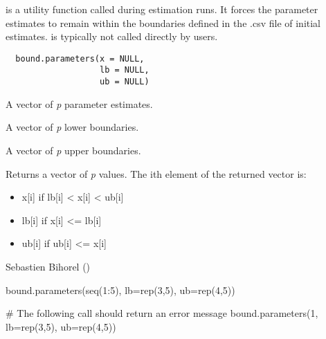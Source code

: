 %
\begin{Description}\relax
{} is a utility function called during estimation runs. 
It forces the parameter estimates to remain within the boundaries defined in 
the .csv file of initial estimates.  is typically not 
called directly by users.
\end{Description}
%
\begin{Usage}
\begin{verbatim}
  bound.parameters(x = NULL,
                   lb = NULL,
                   ub = NULL)
\end{verbatim}
\end{Usage}
%
\begin{Arguments}
\begin{ldescription}
\item[\code{x}] A vector of \emph{p} parameter estimates.
\item[\code{lb}] A vector of \emph{p} lower boundaries.
\item[\code{ub}] A vector of \emph{p} upper boundaries.
\end{ldescription}
\end{Arguments}
%
\begin{Value}
Returns a vector of \emph{p} values. The ith element of the returned vector 
is: \begin{itemize}

\item x[i]  if lb[i] < x[i] < ub[i]
\item lb[i] if x[i] <= lb[i]
\item ub[i] if ub[i] <= x[i]

\end{itemize}

\end{Value}
%
\begin{Author}\relax
Sebastien Bihorel ()
\end{Author}
%
\begin{Examples}
\begin{ExampleCode}

bound.parameters(seq(1:5), lb=rep(3,5), ub=rep(4,5))

# The following call should return an error message
bound.parameters(1, lb=rep(3,5), ub=rep(4,5))

\end{ExampleCode}
\end{Examples}
